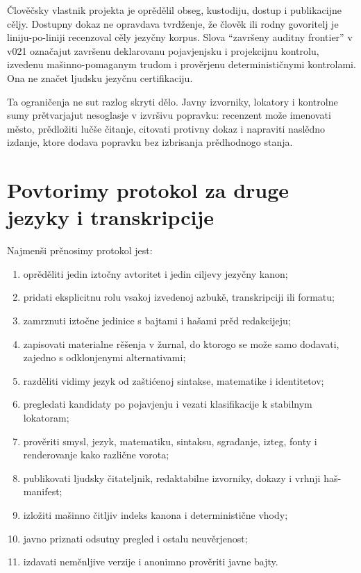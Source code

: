 \documentclass[11pt]{article}
\begin{document}
Člověčsky vlastnik projekta je oprědělil obseg, kustodiju, dostup i publikacijne cěljy. Dostupny dokaz ne opravdava tvrdženje, že člověk ili rodny govoritelj je liniju-po-liniji recenzoval cěly jezyčny korpus. Slova ``završeny auditny frontier'' v v021 označajut završenu deklarovanu pojavjenjsku i projekcijnu kontrolu, izvedenu mašinno-pomaganym trudom i prověrjenu determinističnymi kontrolami. Ona ne značet ljudsku jezyčnu certifikaciju.

Ta ograničenja ne sut razlog skryti dělo. Javny izvorniky, lokatory i kontrolne sumy prětvarjajut nesoglasje v izvršivu popravku: recenzent može imenovati město, prědložiti lučše čitanje, citovati protivny dokaz i napraviti naslědno izdanje, ktore dodava popravku bez izbrisanja prědhodnogo stanja.

\section{Povtorimy protokol za druge jezyky i transkripcije}

Najmenši prěnosimy protokol jest:

\begin{enumerate}
\item oprěděliti jedin iztočny avtoritet i jedin ciljevy jezyčny kanon;
\item pridati eksplicitnu rolu vsakoj izvedenoj azbukě, transkripciji ili formatu;
\item zamrznuti iztočne jedinice s bajtami i hašami prěd redakcijeju;
\item zapisovati materialne rěšenja v žurnal, do ktorogo se može samo dodavati, zajedno s odklonjenymi alternativami;
\item razděliti vidimy jezyk od zaštićenoj sintakse, matematike i identitetov;
\item pregledati kandidaty po pojavjenju i vezati klasifikacije k stabilnym lokatoram;
\item prověriti smysl, jezyk, matematiku, sintaksu, sgrađanje, izteg, fonty i renderovanje kako različne vorota;
\item publikovati ljudsky čitateljnik, redaktabilne izvorniky, dokazy i vrhnji haš-manifest;
\item izložiti mašinno čitljiv indeks kanona i deterministične vhody;
\item javno priznati odsutny pregled i ostalu neuvěrjenost;
\item izdavati neměnljive verzije i anonimno prověriti javne bajty.
\end{enumerate}
\end{document}
